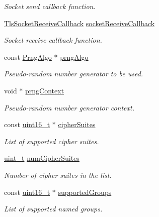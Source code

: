 \begin{DoxyCompactItemize}
\begin{DoxyCompactList}\small\item\em Socket send callback function. \end{DoxyCompactList}\item 
\hyperlink{tls_8h_a4588e69c3d9708c560b24ea04afa6a9c}{Tls\+Socket\+Receive\+Callback} \hyperlink{struct__TlsContext_afa3aee1f8a07123f871eaf9c13802785}{socket\+Receive\+Callback}
\begin{DoxyCompactList}\small\item\em Socket receive callback function. \end{DoxyCompactList}\item 
const \hyperlink{structPrngAlgo}{Prng\+Algo} $\ast$ \hyperlink{struct__TlsContext_ad127af70cd978e5b8e5fcda9873229e6}{prng\+Algo}
\begin{DoxyCompactList}\small\item\em Pseudo-\/random number generator to be used. \end{DoxyCompactList}\item 
void $\ast$ \hyperlink{struct__TlsContext_a32fba3ca095b163a1a0c29b9866cbba8}{prng\+Context}
\begin{DoxyCompactList}\small\item\em Pseudo-\/random number generator context. \end{DoxyCompactList}\item 
const \hyperlink{stdint_8h_a273cf69d639a59973b6019625df33e30}{uint16\+\_\+t} $\ast$ \hyperlink{struct__TlsContext_a88ee16ad0220734aba6b5e61554b6dfa}{cipher\+Suites}
\begin{DoxyCompactList}\small\item\em List of supported cipher suites. \end{DoxyCompactList}\item 
\hyperlink{compiler__port_8h_a12a1e9b3ce141648783a82445d02b58d}{uint\+\_\+t} \hyperlink{struct__TlsContext_a8a1f9843ffb44e59be29ec6946073522}{num\+Cipher\+Suites}
\begin{DoxyCompactList}\small\item\em Number of cipher suites in the list. \end{DoxyCompactList}\item 
const \hyperlink{stdint_8h_a273cf69d639a59973b6019625df33e30}{uint16\+\_\+t} $\ast$ \hyperlink{struct__TlsContext_aa72a68ae5e2e8d84e69a907f49b3437b}{supported\+Groups}
\begin{DoxyCompactList}\small\item\em List of supported named groups. \end{DoxyCompactList}\item 

\end{DoxyCompactItemize}
